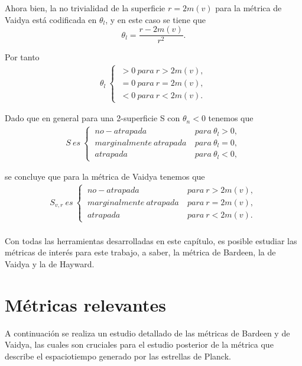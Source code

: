 \documentclass[16pt,a4paper]{article}
\numberwithin{equation}{section}
\theoremstyle{definition}
\begin{document}
Ahora bien, la no trivialidad de la superficie $r = 2m(v)$ para la métrica de Vaidya está codificada en $\theta_l$, y en este caso se tiene que
\begin{equation*}
\theta_l = \frac{r - 2m(v)}{r^2}.
\end{equation*} 

Por tanto
\begin{align*}
\theta_l\ 
\begin{cases}
\ >0\ para\ r>2m(v),\\
\ =0\ para\ r=2m(v),\\
\ <0\ para\ r<2m(v).
\end{cases}
\end{align*}

Dado que en general para una 2-superficie S con $\theta_n < 0$ tenemos que 
\begin{align*}
S\ es\ 
\begin{cases}
\ no-atrapada\ & para\ \theta_l>0,\\
\ marginalmente\ atrapada\ & para\ \theta_l=0,\\
\ atrapada\ & para\ \theta_l<0,
\end{cases}
\end{align*}

se concluye que para la métrica de Vaidya tenemos que 
\begin{align*}
S_{v,r}\ es\ 
\begin{cases}
\ no-atrapada\ & para\ r>2m(v),\\
\ marginalmente\ atrapada\ & para\ r=2m(v),\\
\ atrapada\ & para\ r<2m(v).
\end{cases}
\end{align*}
\
\\

Con todas las herramientas desarrolladas en este capítulo, es posible estudiar las métricas de interés para este trabajo, a saber, la métrica de Bardeen, la de Vaidya y la de Hayward.

\newpage
\section{\label{previous metrics section} Métricas relevantes}

A continuación se realiza un estudio detallado de las métricas de Bardeen y de Vaidya, las cuales son cruciales para el estudio posterior de la métrica que describe el espaciotiempo generado por las estrellas de Planck.
\end{document}
